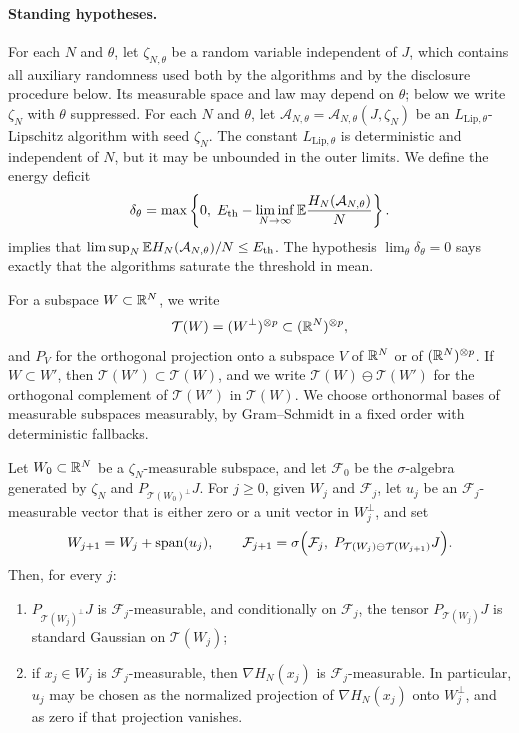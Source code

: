 \paragraph{Standing hypotheses.}
For each $N$ and $\theta$, let $\zeta_{N,\theta}$ be a random variable independent of $J$, which contains all
auxiliary randomness used both by the algorithms and by the disclosure
procedure below. Its measurable space and law may depend on $\theta$;
below we write $\zeta_N$ with $\theta$ suppressed. For each $N$ and $\theta$, let
$\mathcal A_{N,\theta}=\mathcal A_{N,\theta}(J,\zeta_N)$ be an
$L_{\mathrm{Lip},\theta}$-Lipschitz algorithm with seed $\zeta_N$. The constant
$L_{\mathrm{Lip},\theta}$ is deterministic and independent of $N$, but it may be
unbounded in the outer limits. We define the energy deficit
\begin{equation}\label{sel:adaptive-deficit}
 \delta_\theta=\max\left\{0,\;E_{\mathrm{th}}-\liminf_{N\to\infty}
 \mathbb E\frac{H_N(\mathcal A_{N,\theta})}N\right\}.
\end{equation}
 implies that
$\limsup_N\mathbb E H_N(\mathcal A_{N,\theta})/N\le E_{\mathrm{th}}$. The hypothesis
$\lim_\theta\delta_\theta=0$ says exactly that the algorithms saturate the
threshold in mean.

For a subspace $W\subset\mathbb R^N$, we write
\[
 \mathcal T(W)=(W^\perp)^{\otimes p}\subset(\mathbb R^N)^{\otimes p},
\]
and $P_V$ for the orthogonal projection onto a subspace $V$ of $\mathbb R^N$ or of
$(\mathbb R^N)^{\otimes p}$. If $W\subset W'$, then $\mathcal T(W')\subset\mathcal T(W)$,
and we write $\mathcal T(W)\ominus\mathcal T(W')$ for the orthogonal
complement of $\mathcal T(W')$ in $\mathcal T(W)$. We choose orthonormal
bases of measurable subspaces measurably, by Gram--Schmidt in a fixed order
with deterministic fallbacks.

\begin{lemma}\label{sel:adaptive-disclosure}
Let $W_0\subset\mathbb R^N$ be a $\zeta_N$-measurable subspace, and let
$\mathcal F_0$ be the $\sigma$-algebra generated by $\zeta_N$ and
$P_{\mathcal T(W_0)^\perp}J$. For $j\ge0$, given $W_j$ and $\mathcal F_j$,
let $u_j$ be an $\mathcal F_j$-measurable vector that is either zero or a
unit vector in $W_j^\perp$, and set
\[
 W_{j+1}=W_j+\operatorname{span}(u_j),\qquad
 \mathcal F_{j+1}=\sigma\Big(\mathcal F_j,\;
 P_{\mathcal T(W_j)\ominus\mathcal T(W_{j+1})}J\Big).
\]
Then, for every $j$:
\begin{enumerate}[label=(\roman*)]
\item\label{item:disclosure-gaussian}
$P_{\mathcal T(W_j)^\perp}J$ is $\mathcal F_j$-measurable, and conditionally
on $\mathcal F_j$, the tensor $P_{\mathcal T(W_j)}J$ is standard Gaussian on
$\mathcal T(W_j)$;
\item\label{item:disclosure-gradient}
if $x_j\in W_j$ is $\mathcal F_j$-measurable, then $\nabla H_N(x_j)$ is
$\mathcal F_j$-measurable. In particular, $u_j$ may be chosen as the
normalized projection of $\nabla H_N(x_j)$ onto $W_j^\perp$, and as zero if
that projection vanishes.
\end{enumerate}
\end{lemma}

